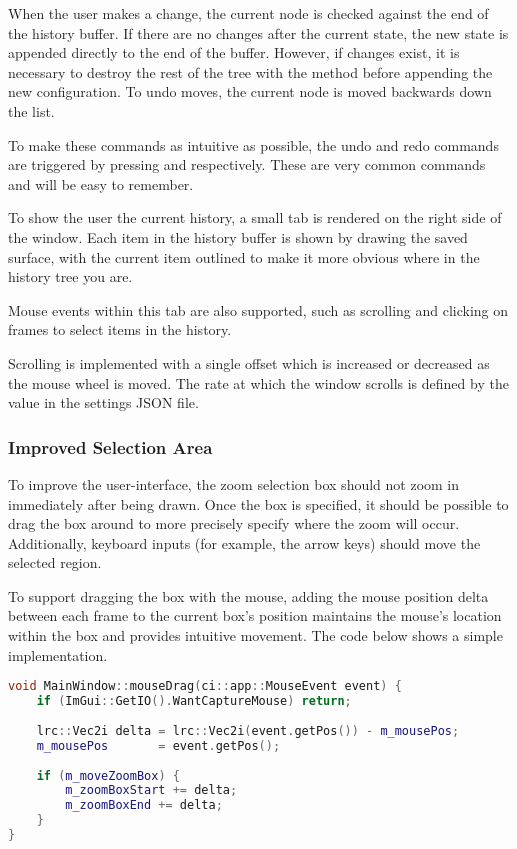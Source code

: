 When the user makes a change, the current node is checked against the end of the history buffer. If there are no changes after the current state, the new state is appended directly to the end of the buffer. However, if changes exist, it is necessary to destroy the rest of the tree with the  method before appending the new configuration. To undo moves, the current node is moved backwards down the list.

To make these commands as intuitive as possible, the undo and redo commands are triggered by pressing  and  respectively. These are very common commands and will be easy to remember.

To show the user the current history, a small tab is rendered on the right side of the window. Each item in the history buffer is shown by drawing the saved surface, with the current item outlined to make it more obvious where in the history tree you are.

Mouse events within this tab are also supported, such as scrolling and clicking on frames to select items in the history.

Scrolling is implemented with a single offset which is increased or decreased as the mouse wheel is moved. The rate at which the window scrolls is defined by the  value in the settings JSON file.

\subsubsection{Improved Selection Area}

To improve the user-interface, the zoom selection box should not zoom in immediately after being drawn. Once the box is specified, it should be possible to drag the box around to more precisely specify where the zoom will occur. Additionally, keyboard inputs (for example, the arrow keys) should move the selected region.

To support dragging the box with the mouse, adding the mouse position delta between each frame to the current box's position maintains the mouse's location within the box and provides intuitive movement. The code below shows a simple implementation.

\begin{lstlisting}[language=c++]
void MainWindow::mouseDrag(ci::app::MouseEvent event) {
	if (ImGui::GetIO().WantCaptureMouse) return;
	
	lrc::Vec2i delta = lrc::Vec2i(event.getPos()) - m_mousePos;
	m_mousePos		 = event.getPos();
	
	if (m_moveZoomBox) {
		m_zoomBoxStart += delta;
		m_zoomBoxEnd += delta;
	}
}
\end{lstlisting}

